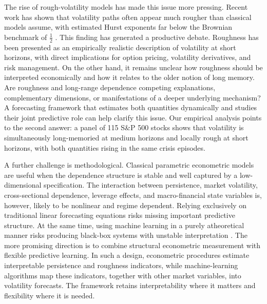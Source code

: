\documentclass[11pt,a4paper]{article}
\begin{document}
The rise of rough-volatility models has made this issue more pressing.
Recent work has shown that volatility paths often appear much rougher than
classical models assume, with estimated Hurst exponents far below the
Brownian benchmark of $\tfrac12$
\citep{gatheral2018volatility,bennedsen2021decoupling}. This finding has
generated a productive debate. Roughness has been presented as an
empirically realistic description of volatility at short horizons, with
direct implications for option pricing, volatility derivatives, and risk
management. On the other hand, it remains unclear how roughness should be
interpreted economically and how it relates to the older notion of long
memory. Are roughness and long-range dependence competing explanations,
complementary dimensions, or manifestations of a deeper underlying
mechanism? A forecasting framework that estimates both quantities
dynamically and studies their joint predictive role can help clarify this
issue. Our empirical analysis points to the second answer: a panel of 115
S\&P 500 stocks shows that volatility is simultaneously long-memoried at
medium horizons and locally rough at short horizons, with both quantities
rising in the same crisis episodes.

A further challenge is methodological. Classical parametric econometric
models are useful when the dependence structure is stable and well captured
by a low-dimensional specification. The interaction between persistence,
market volatility, cross-sectional dependence, leverage effects, and
macro-financial state variables is, however, likely to be nonlinear and
regime dependent. Relying exclusively on traditional linear forecasting
equations risks missing important predictive structure. At the same time,
using machine learning in a purely atheoretical manner risks producing
black-box systems with unstable interpretation \citep{gu2020empirical}. The
more promising direction is to combine structural econometric measurement
with flexible predictive learning. In such a design, econometric procedures
estimate interpretable persistence and roughness indicators, while
machine-learning algorithms map these indicators, together with other
market variables, into volatility forecasts. The framework retains
interpretability where it matters and flexibility where it is needed.
\end{document}
